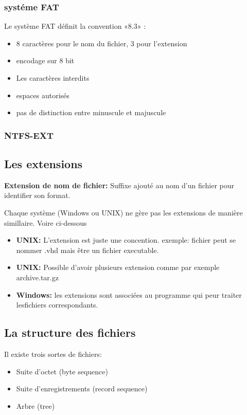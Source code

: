 \subsubsection{systéme FAT}
Le système FAT définit la convention «8.3» :
\begin{itemize}
    \item 8 caractères pour le nom  du fichier, 3 pour l'extension
    \item encodage sur 8 bit 
    \item Les caractères interdits
    \item espaces autorisés
    \item pas de distinction entre minuscule et majuscule
\end{itemize}

\subsubsection{NTFS-EXT}

\subsection{Les extensions}

\textbf{Extension de nom de fichier: }Suffixe ajouté au nom d'un fichier pour identifier son format.

Chaque système (Windows ou UNIX) ne gère pas les extensions de manière simillaire. Voire ci-dessous

\begin{itemize}
    \item \textbf{UNIX: }L'extension est juste une concention. exemple: fichier peut se nommer .vhd mais être un fichier executable. 
    \item \textbf{UNIX: }Possible d'avoir plusieurs extension comme par exemple archive.tar.gz
    \item \textbf{Windows: }les extensions sont associées au programme qui peur traiter lesfichiers correspondants.
\end{itemize}


\subsection{La structure des fichiers}
Il existe trois sortes de fichiers:
\begin{itemize}
    \item Suite d’octet (byte sequence)
    \item Suite d’enregistrements (record sequence)
    \item Arbre (tree)
\end{itemize}

